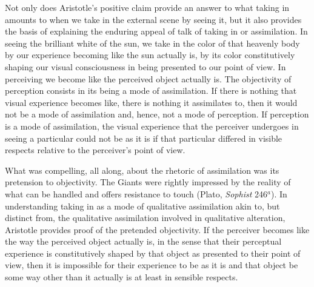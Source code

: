 Not only does Aristotle's positive claim provide an answer to what taking in amounts to when we take in the external scene by seeing it, but it also provides the basis of explaining the enduring appeal of talk of taking in or assimilation. In seeing the brilliant white of the sun, we take in the color of that heavenly body by our experience becoming like the sun actually is, by its color constitutively shaping our visual consciousness in being presented to our point of view. In perceiving we become like the perceived object actually is. The objectivity of perception consists in its being a mode of assimilation. If there is nothing that visual experience becomes like, there is nothing it assimilates to, then it would not be a mode of assimilation and, hence, not a mode of perception. If perception is a mode of assimilation, the visual experience that the perceiver undergoes in seeing a particular could not be as it is if that particular differed in visible respects relative to the perceiver's point of view. 

What was compelling, all along, about the rhetoric of assimilation was its pretension to objectivity. The Giants were rightly impressed by the reality of what can be handled and offers resistance to touch (Plato, \emph{Sophist} 246\( ^{a} \)). In understanding taking in as a mode of qualitative assimilation akin to, but distinct from, the qualitative assimilation involved in qualitative alteration, Aristotle provides proof of the pretended objectivity. If the perceiver becomes like the way the perceived object actually is, in the sense that their perceptual experience is constitutively shaped by that object as presented to their point of view, then it is impossible for their experience to be as it is and that object be some way other than it actually is at least in sensible respects.

